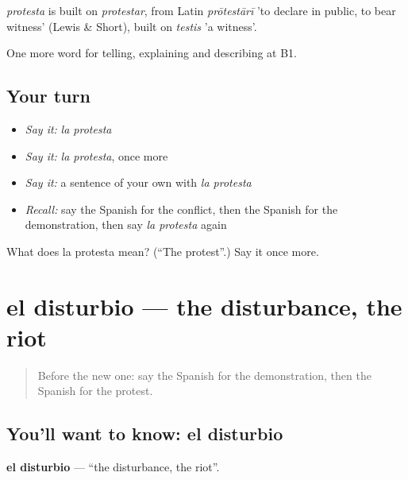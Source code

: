 \begin{cousinweb}
\emph{protesta} is built on \emph{protestar}, from Latin \emph{prōtestārī} 'to declare in public, to bear witness' (Lewis \& Short), built on \emph{testis} 'a witness'.
\end{cousinweb}

\begin{grammarlens}[title={What you've built}]
One more word for telling, explaining and describing at B1.
\end{grammarlens}

\subsection*{Your turn}
\begin{itemize}
\raggedright
  \item \emph{Say it:} \emph{la protesta}
  \item \emph{Say it:} \emph{la protesta}, once more
  \item \emph{Say it:} a sentence of your own with \emph{la protesta}
  \item \emph{Recall:} say the Spanish for the conflict, then the Spanish for the demonstration, then say \emph{la protesta} again
\end{itemize}

\begin{tcolorbox}[breakable,colback=teal!4,colframe=teal!35!black,title={Before you move on}]
What does la protesta mean? (\textquotedblleft{}The protest\textquotedblright{}.) Say it once more.
\end{tcolorbox}
\section[el disturbio]{el disturbio — the disturbance, the riot}

\label{lesson:ES-C570-disturbio}



\begin{quote}
Before the new one: say the Spanish for the demonstration, then the Spanish for the protest.
\end{quote}

\subsection*{You'll want to know: el disturbio}
\textbf{el disturbio} — \textquotedblleft{}the disturbance, the riot\textquotedblright{}.


